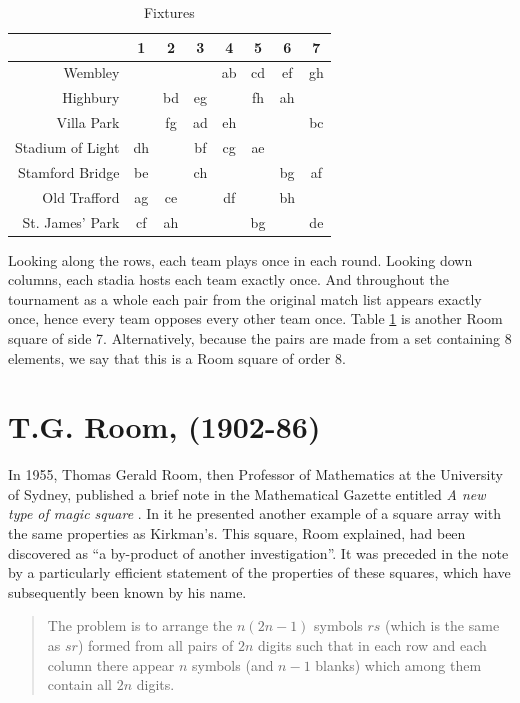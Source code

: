\documentclass[
  11pt,
  a4paper]{book}
\newcounter{example}
\begin{document}
\begin{table}[h!]
  \begin{center}
    \caption{Fixtures}
    \label{tab:fixtures}
    \begin{tabular}{r|ccccccc}
                       & 1  &  2 &  3 &  4 &  5 &  6 &  7 \\ \hline
               Wembley &    &    &    & ab & cd & ef & gh \\
              Highbury &    & bd & eg &    & fh & ah &    \\
            Villa Park &    & fg & ad & eh &    &    & bc \\
      Stadium of Light & dh &    & bf & cg & ae &    &    \\
       Stamford Bridge & be &    & ch &    &    & bg & af \\
          Old Trafford & ag & ce &    & df &    & bh &    \\
       St. James' Park & cf & ah &    &    & bg &    & de
    \end{tabular}
  \end{center}
\end{table}

Looking along the rows, each team plays once in each round. Looking down
columns, each stadia hosts each team exactly once. And throughout the
tournament as a whole each pair from the original match list appears
exactly once, hence every team opposes every other team once. Table
\ref{tab:fixtures} is another Room square of side 7. Alternatively,
because the pairs are made from a set containing 8 elements, we say that
this is a Room square of order 8.

\hypertarget{t.g.-room-1902-86}{%
\section{T.G. Room, (1902-86)}\label{t.g.-room-1902-86}}

In 1955, Thomas Gerald Room, then Professor of Mathematics at the
University of Sydney, published a brief note in the Mathematical Gazette
entitled \emph{A new type of magic square} \autocite{room_2569_1955}. In
it he presented another example of a square array with the same
properties as Kirkman's. This square, Room explained, had been
discovered as ``a by-product of another investigation''. It was preceded
in the note by a particularly efficient statement of the properties of
these squares, which have subsequently been known by his name.

\begin{quote}
The problem is to arrange the \(n(2n-1)\) symbols \(rs\) (which is the
same as \(sr\)) formed from all pairs of \(2n\) digits such that in each
row and each column there appear \(n\) symbols (and \(n-1\) blanks)
which among them contain all \(2n\) digits.
\end{quote}
\end{document}
